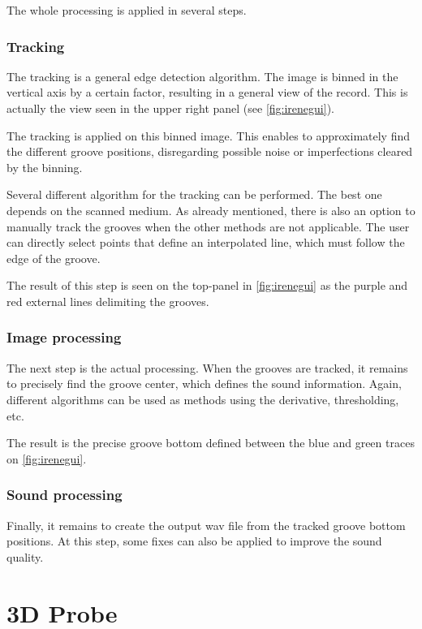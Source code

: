 The whole processing is applied in several steps.

\subsubsection{Tracking}

The tracking is a general edge detection algorithm. The image is binned in the vertical axis by a certain factor, resulting in a general view of the record. This is actually the view seen in the upper right panel (see \autoref{fig:irenegui}).

The tracking is applied on this binned image. This enables to approximately find the different groove positions, disregarding possible noise or imperfections cleared by the binning.

Several different algorithm for the tracking can be performed. The best one depends on the scanned medium. As already mentioned, there is also an option to manually track the grooves when the other methods are not applicable. The user can directly select points that define an interpolated line, which must follow the edge of the groove.

The result of this step is seen on the top-panel in \autoref{fig:irenegui} as the purple and red external lines delimiting the grooves.

\subsubsection{Image processing}

The next step is the actual processing. When the grooves are tracked, it remains to precisely find the groove center, which defines the sound information. Again, different algorithms can be used as methods using the derivative, thresholding, etc.

The result is the precise groove bottom defined between the blue and green traces on \autoref{fig:irenegui}.

\subsubsection{Sound processing}

Finally, it remains to create the output \gls{wav} file from the tracked groove bottom positions. At this step, some fixes can also be applied to improve the sound quality.

\section{3D Probe}

